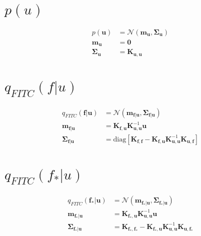 \documentclass[12pt, landscape]{article}
\begin{document}
\section{$p(u)$}
\begingroup\makeatletter{}\check@mathfonts
\def\maketag@@@#1{\hbox{\m@th\large\normalfont#1}}
\begin{align*}
p\left(\mathbf{u}\right)&= \mathcal{N}\left(\mathbf{m}_{\mathbf{u}},\mathbf{\Sigma}_{\mathbf{u}}\right)\\
\mathbf{m}_{\mathbf{u}} &= \mathbf{0}\\
\mathbf{\Sigma}_{\mathbf{u}} &= \mathbf{K}_{\mathbf{u},\mathbf{u}}\\
\end{align*}\endgroup

\section{$q_{FITC}(f|u)$}
\begingroup\makeatletter{}\check@mathfonts
\def\maketag@@@#1{\hbox{\m@th\large\normalfont#1}}
\begin{align*}
q_{FITC}\left(\mathbf{f}|\mathbf{u}\right)&= \mathcal{N}\left(\mathbf{m}_{\mathbf{f}|\mathbf{u}},\mathbf{\Sigma}_{\mathbf{f}|\mathbf{u}}\right)\\
\mathbf{m}_{\mathbf{f}|\mathbf{u}} &= \mathbf{K}_{\mathbf{f},\mathbf{u}} \mathbf{K}_{\mathbf{u},\mathbf{u}}^{-1} \mathbf{u}\\
\mathbf{\Sigma}_{\mathbf{f}|\mathbf{u}} &= \text{diag}[\mathbf{K}_{\mathbf{f},\mathbf{f}} - \mathbf{K}_{\mathbf{f},\mathbf{u}} \mathbf{K}_{\mathbf{u},\mathbf{u}}^{-1} \mathbf{K}_{\mathbf{u},\mathbf{f}}]\\
\end{align*}\endgroup

\section{$q_{FITC}(f_{*}|u)$}
\begingroup\makeatletter{}\check@mathfonts
\def\maketag@@@#1{\hbox{\m@th\large\normalfont#1}}
\begin{align*}
q_{FITC}\left(\mathbf{f_{*}}|\mathbf{u}\right)&= \mathcal{N}\left(\mathbf{m}_{\mathbf{f_{*}}|\mathbf{u}},\mathbf{\Sigma}_{\mathbf{f_{*}}|\mathbf{u}}\right)\\
\mathbf{m}_{\mathbf{f_{*}}|\mathbf{u}} &= \mathbf{K}_{\mathbf{f_{*}},\mathbf{u}} \mathbf{K}_{\mathbf{u},\mathbf{u}}^{-1} \mathbf{u}\\
\mathbf{\Sigma}_{\mathbf{f_{*}}|\mathbf{u}} &= \mathbf{K}_{\mathbf{f_{*}},\mathbf{f_{*}}} - \mathbf{K}_{\mathbf{f_{*}},\mathbf{u}} \mathbf{K}_{\mathbf{u},\mathbf{u}}^{-1} \mathbf{K}_{\mathbf{u},\mathbf{f_{*}}}\\
\end{align*}\endgroup
\end{document}
